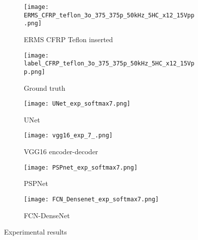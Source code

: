 \begin{figure} [!h]
	\centering
	\begin{subfigure}[b]{0.47\textwidth}
		\centering
		\texttt{[image: ERMS\_CFRP\_teflon\_3o\_375\_375p\_50kHz\_5HC\_x12\_15Vpp.png]}
		\caption{ERMS CFRP Teflon inserted}
		\label{fig:Delamination}
	\end{subfigure}			
	\hfill
	\begin{subfigure}[b]{0.47\textwidth}
		\centering 	
		\texttt{[image: label\_CFRP\_teflon\_3o\_375\_375p\_50kHz\_5HC\_x12\_15Vpp.png]}
		\caption{Ground truth} 
		\label{fig:damage_label}
	\end{subfigure}
	\hfill
	\begin{subfigure}[b]{0.47\textwidth}
		\centering
		\texttt{[image: UNet\_exp\_softmax7.png]}
		\caption{UNet} 
		\label{fig:unet_exp_7_}
	\end{subfigure}
	\hfill
	\begin{subfigure}[b]{0.47\textwidth}
	\centering
	\texttt{[image: vgg16\_exp\_7\_.png]}
	\caption{VGG16 encoder-decoder} 
	\label{fig:vgg16_exp_7_}
	\end{subfigure}
	\hfill
	\begin{subfigure}[b]{0.47\textwidth}
		\centering
		\texttt{[image: PSPnet\_exp\_softmax7.png]}
		\caption{PSPNet} 
		\label{fig:pspnet_exp_7_}
	\end{subfigure}
	\hfill
	\begin{subfigure}[b]{0.47\textwidth}
		\centering
		\texttt{[image: FCN\_Densenet\_exp\_softmax7.png]}
		\caption{FCN-DenseNet} 
		\label{fig:fcn_densenet_exp}
	\end{subfigure}
		\caption{Experimental results}
		\label{fig:Exp_ERMS_teflon}
	\end{figure}

